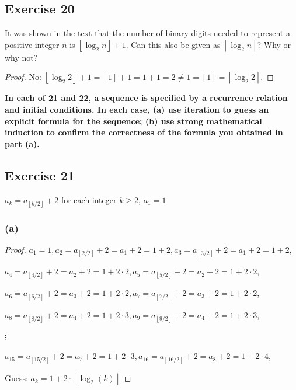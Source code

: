 \documentclass[14pt]{extarticle}
\newcommand{\cy}{\color{cyan}}
\newcommand{\floor}[1]{{\left\lfloor#1\right\rfloor}}
\newcommand{\ceil}[1]{{\left\lceil#1\right\rceil}}
\begin{document}
\subsection{Exercise 20}
It was shown in the text that the number of binary digits needed to represent a positive integer \(n\) is
\(\floor{\log_2 n} + 1\). Can this also be given as \(\ceil{\log_2 n}\)? Why or why not?

\begin{proof}
    No: \(\floor{\log_2 2} + 1 = \floor{1} + 1 = 1 + 1 = 2 \neq 1 = \ceil{1} = \ceil{\log_2 2}\).
\end{proof}

{\bf \cy In each of 21 and 22, a sequence is specified by a recurrence relation and initial conditions. In each case, (a)
use iteration to guess an explicit formula for the sequence; (b) use strong mathematical induction to confirm the
correctness of the formula you obtained in part (a).}

\subsection{Exercise 21}
\(a_k = a_{\floor{k/2}} + 2\) for each integer \(k \geq 2\), \(a_1 = 1\)

\subsubsection{(a)}
\begin{proof}
    \(a_1 = 1, a_2 = a_{\floor{2/2}} + 2 = a_1 + 2 = 1 + 2, a_3 = a_{\floor{3/2}} + 2 = a_1 + 2 = 1 + 2,\)

    \(a_4 = a_{\floor{4/2}} + 2 = a_2 + 2 = 1 + 2 \cdot 2, a_5 = a_{\floor{5/2}} + 2 = a_2 + 2 = 1 + 2 \cdot 2\),

    \(a_6 = a_{\floor{6/2}} + 2 = a_3 + 2 = 1 + 2 \cdot 2, a_7 = a_{\floor{7/2}} + 2 = a_3 + 2 = 1 + 2 \cdot 2\),

    \(a_8 = a_{\floor{8/2}} + 2 = a_4 + 2 = 1 + 2 \cdot 3, a_9 = a_{\floor{9/2}} + 2 = a_4 + 2 = 1 + 2 \cdot 3\),

    \(\vdots\)

    \(a_{15} = a_{\floor{15/2}} + 2 = a_7 + 2 = 1 + 2 \cdot 3, a_{16} = a_{\floor{16/2}} + 2 = a_8 + 2 = 1 + 2 \cdot 4\),

    Guess: \(a_k = 1 + 2 \cdot \floor{\log_2(k)}\)
\end{proof}
\end{document}
